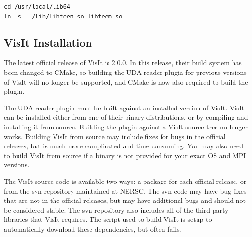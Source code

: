 \documentclass[12pt]{article}
\begin{document}
\begin{verbatim}
cd /usr/local/lib64
ln -s ../lib/libteem.so libteem.so
\end{verbatim}

\subsection{VisIt Installation}

The latest official release of VisIt is 2.0.0.  In this release, their build
system has been changed to CMake, so building the UDA reader plugin for
previous versions of VisIt will no longer be supported, and CMake is now also
required to build the plugin.

The UDA reader plugin must be built against an installed version of VisIt. 
VisIt can be installed either from one of their binary distributions, or by
compiling and installing it from source.  Building the plugin against a
VisIt source tree no longer works.  Building VisIt from source may include
fixes for bugs in the official releases, but is much more complicated and
time consuming.  You may also need to build VisIt from source if a binary is
not provided for your exact OS and MPI versions.  

The VisIt source code is available two ways: a package for each official release, or from
the svn repository maintained at NERSC.  The svn code may have bug fixes that
are not in the official releases, but may have additional bugs and should not
be considered stable.  The svn repository also includes all of the third party
libraries that VisIt requires.  The script used to build VisIt is setup to 
automatically download these dependencies, but often fails.
\end{document}
